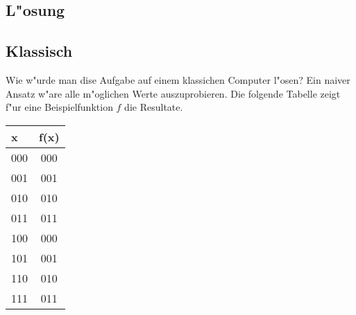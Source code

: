 \begin{refsection}
% 
% 

\section{L"osung}

\subsection{Klassisch}

Wie w"urde man dise Aufgabe auf einem klassichen Computer l"osen? Ein naiver
Ansatz w"are alle m"oglichen Werte auszuprobieren. Die folgende Tabelle zeigt
f"ur eine Beispielfunktion $f$ die Resultate.


\begin{center}
   \begin{tabular}{ l | c  }
    \hline
     x   & f(x) \\ \hline
     000 & 000  \\ \hline
     001 & 001  \\ \hline
     010 & 010  \\ \hline
     011 & 011  \\ \hline
     100 & 000  \\ \hline
     101 & 001  \\ \hline
     110 & 010  \\ \hline
     111 & 011  \\ \hline
     \hline
    \end{tabular}
\end{center}



\end{refsection}
